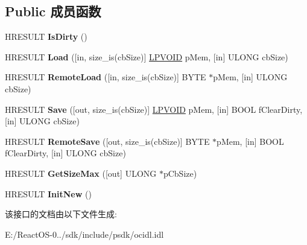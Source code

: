 \subsection*{Public 成员函数}
\begin{DoxyCompactItemize}
\item 
\mbox{\label{interface_i_persist_memory_a0b469993388415cf1f55a93ded2582a6}} 
H\+R\+E\+S\+U\+LT {\bfseries Is\+Dirty} ()
\item 
\mbox{\label{interface_i_persist_memory_a647232d1fc041dfeedb7125c3c4343bf}} 
H\+R\+E\+S\+U\+LT {\bfseries Load} (\mbox{[}in, size\+\_\+is(cb\+Size)\mbox{]} \hyperlink{interfacevoid}{L\+P\+V\+O\+ID} p\+Mem, \mbox{[}in\mbox{]} U\+L\+O\+NG cb\+Size)
\item 
\mbox{\label{interface_i_persist_memory_a411f7ca8a9adbf791e6738a1041caac1}} 
H\+R\+E\+S\+U\+LT {\bfseries Remote\+Load} (\mbox{[}in, size\+\_\+is(cb\+Size)\mbox{]} B\+Y\+TE $\ast$p\+Mem, \mbox{[}in\mbox{]} U\+L\+O\+NG cb\+Size)
\item 
\mbox{\label{interface_i_persist_memory_ab62712bc5dfd95514082143aaf667e02}} 
H\+R\+E\+S\+U\+LT {\bfseries Save} (\mbox{[}out, size\+\_\+is(cb\+Size)\mbox{]} \hyperlink{interfacevoid}{L\+P\+V\+O\+ID} p\+Mem, \mbox{[}in\mbox{]} B\+O\+OL f\+Clear\+Dirty, \mbox{[}in\mbox{]} U\+L\+O\+NG cb\+Size)
\item 
\mbox{\label{interface_i_persist_memory_a5e1bc30d8f12d35a4869398d530bde47}} 
H\+R\+E\+S\+U\+LT {\bfseries Remote\+Save} (\mbox{[}out, size\+\_\+is(cb\+Size)\mbox{]} B\+Y\+TE $\ast$p\+Mem, \mbox{[}in\mbox{]} B\+O\+OL f\+Clear\+Dirty, \mbox{[}in\mbox{]} U\+L\+O\+NG cb\+Size)
\item 
\mbox{\label{interface_i_persist_memory_a2284e3740cb10d96769141e19b8a88c8}} 
H\+R\+E\+S\+U\+LT {\bfseries Get\+Size\+Max} (\mbox{[}out\mbox{]} U\+L\+O\+NG $\ast$p\+Cb\+Size)
\item 
\mbox{\label{interface_i_persist_memory_ab4b60891f3e466614fed56a011438f9d}} 
H\+R\+E\+S\+U\+LT {\bfseries Init\+New} ()
\end{DoxyCompactItemize}


该接口的文档由以下文件生成\+:\begin{DoxyCompactItemize}
\item 
E\+:/\+React\+O\+S-\/0../sdk/include/psdk/ocidl.\+idl\end{DoxyCompactItemize}
